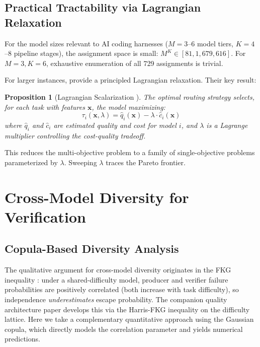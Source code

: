 \documentclass[11pt, a4paper, copyright]{googledeepmind}
\newtheorem{proposition}{Proposition}[section]
\begin{document}
\subsection{Practical Tractability via Lagrangian Relaxation}

For the model sizes relevant to AI coding harnesses ($M = 3$--$6$ model tiers, $K = 4$--$8$ pipeline stages), the assignment space is small: $M^K \in [81, 1{,}679{,}616]$. For $M = 3, K = 6$, exhaustive enumeration of all 729 assignments is trivial.

For larger instances, \citet{dekoninck2025cascade} provide a principled Lagrangian relaxation. Their key result:

\begin{proposition}[Lagrangian Scalarization {\citep{dekoninck2025cascade}}]
\label{prop:lagrangian}
The optimal routing strategy selects, for each task with features $\mathbf{x}$, the model maximizing:
\begin{equation}
\label{eq:lagrangian}
\tau_i(\mathbf{x}, \lambda) = \hat{q}_i(\mathbf{x}) - \lambda \cdot \hat{c}_i(\mathbf{x})
\end{equation}
where $\hat{q}_i$ and $\hat{c}_i$ are estimated quality and cost for model $i$, and $\lambda$ is a Lagrange multiplier controlling the cost-quality tradeoff.
\end{proposition}

This reduces the multi-objective problem to a family of single-objective problems parameterized by $\lambda$. Sweeping $\lambda$ traces the Pareto frontier.


\section{Cross-Model Diversity for Verification}
\label{sec:diversity}

\subsection{Copula-Based Diversity Analysis}

The qualitative argument for cross-model diversity originates in the FKG inequality \citep{fkg1971}: under a shared-difficulty model, producer and verifier failure probabilities are positively correlated (both increase with task difficulty), so independence \emph{underestimates} escape probability. The companion quality architecture paper develops this via the Harris-FKG inequality on the difficulty lattice. Here we take a complementary quantitative approach using the Gaussian copula, which directly models the correlation parameter and yields numerical predictions.
\end{document}
